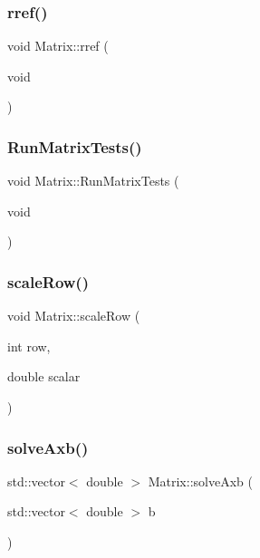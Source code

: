 \mbox{\label{class_matrix_a5510abd211511ab980d69b160d742f78}} 
\subsubsection{\texorpdfstring{rref()}{rref()}}
{\footnotesize\ttfamily void Matrix\+::rref (\begin{DoxyParamCaption}\item[{void}]{ }\end{DoxyParamCaption})}

\mbox{\label{class_matrix_a90d3e687ed2b75462f74b737d891f7ca}} 
\subsubsection{\texorpdfstring{Run\+Matrix\+Tests()}{RunMatrixTests()}}
{\footnotesize\ttfamily void Matrix\+::\+Run\+Matrix\+Tests (\begin{DoxyParamCaption}\item[{void}]{ }\end{DoxyParamCaption})}

\mbox{\label{class_matrix_a37dba2b6d455b7d44ced045ce97a9e05}} 
\subsubsection{\texorpdfstring{scale\+Row()}{scaleRow()}}
{\footnotesize\ttfamily void Matrix\+::scale\+Row (\begin{DoxyParamCaption}\item[{int}]{row,  }\item[{double}]{scalar }\end{DoxyParamCaption})}

\mbox{\label{class_matrix_ae340b61a6f3848f700ba34cd3992d2ab}} 
\subsubsection{\texorpdfstring{solve\+Axb()}{solveAxb()}}
{\footnotesize\ttfamily std\+::vector$<$ double $>$ Matrix\+::solve\+Axb (\begin{DoxyParamCaption}\item[{std\+::vector$<$ double $>$}]{b }\end{DoxyParamCaption})}

